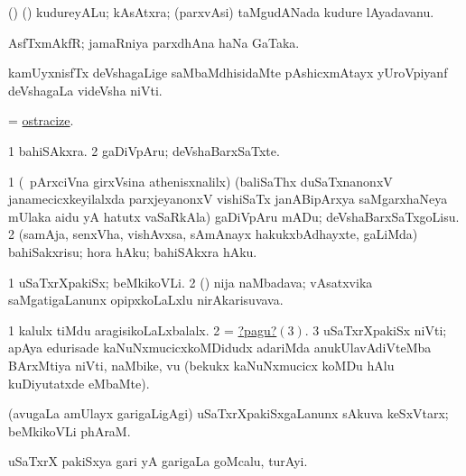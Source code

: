 \bentry
{}
\gl{\nA}
\bmng
(\birx) (\ca) kudureyALu; kAsAtxra; (parxvAsi) taMgudANada kudure lAyadavanu. 
\emng
\eentry

\bentry
{}
\gl{\nA}
\bmng
AsfTxmAkfR; jamaRniya parxdhAna haNa GaTaka. 
\emng
\eentry

\bentry
{}
\gl{\nA}
\bmng
kamUyxnisfTx deVshagaLige saMbaMdhisidaMte pAshicxmAtayx yUroVpiyanf deVshagaLa videVsha niVti. 
\emng
\eentry

\bentry
{}
\gl{\sakirx}
\bmng
= \hyperlink{ostracize}{ostracize}. 
\emng
\eentry

\bentry
{}
\gl{\nA}
\bmng
\bnum
\num{1} bahiSAkxra. 
\num{2} gaDiVpAru; deVshaBarxSaTxte. 
\enum
\emng
\eentry

\bentry
{}
\gl{\sakirx}
\bmng
\bnum
\num{1} (\kanmu\ pArxciVna girxVsina athenisxnalilx) (baliSaThx duSaTxnanonxV janamecicxkeyilalxda parxjeyanonxV vishiSaTx janABipArxya saMgarxhaNeya mUlaka aidu yA hatutx vaSaRkAla) gaDiVpAru mADu; deVshaBarxSaTxgoLisu. 
\num{2} (samAja, senxVha, vishAvxsa, sAmAnayx hakukxbAdhayxte, \mo gaLiMda) bahiSakxrisu; hora hAku; bahiSAkxra hAku. 
\enum
\emng
\eentry

\bentry
{}
\gl{\nA}
\bmng
\bnum
\num{1} uSaTxrXpakiSx; beMkikoVLi.  
\num{2} (\rUpa) nija naMbadava; vAsatxvika saMgatigaLanunx opipxkoLaLxlu nirAkarisuvava. 
\enum
\emng

\noindent
\gl{\pagu}
\bmng
\bnum
\num{1}  kalulx tiMdu aragisikoLaLxbalalx. 
\num{2}  = \hyperlink{ostrichpagu3}{?pagu?\((3)\)}. 
\hypertarget{ostrichpagu3}{} 
\num{3}  uSaTxrXpakiSx niVti; apAya edurisade kaNuNxmucicxkoMDidudx adariMda anukUlavAdiVteMba BArxMtiya niVti, naMbike, \mo vu (bekukx kaNuNxmucicx koMDu hAlu kuDiyutatxde eMbaMte). 
\enum
\emng
\eentry

\bentry
{}
\gl{\nA}
\bmng
(avugaLa amUlayx garigaLigAgi) uSaTxrXpakiSxgaLanunx sAkuva keSxVtarx; beMkikoVLi phAraM. 
\emng
\eentry

\bentry
{}
\gl{\nA}
\bmng
uSaTxrX pakiSxya gari yA garigaLa goMcalu, turAyi. 
\emng
\eentry


